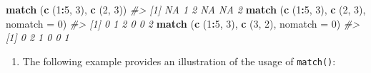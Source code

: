 \documentclass[
]{book}
\newenvironment{Shaded}{\begin{snugshade}}{\end{snugshade}}
\newcommand{\AttributeTok}[1]{\textcolor[rgb]{0.13,0.29,0.53}{#1}}
\newcommand{\CommentTok}[1]{\textcolor[rgb]{0.56,0.35,0.01}{\textit{#1}}}
\newcommand{\DecValTok}[1]{\textcolor[rgb]{0.00,0.00,0.81}{#1}}
\newcommand{\FunctionTok}[1]{\textcolor[rgb]{0.13,0.29,0.53}{\textbf{#1}}}
\newcommand{\NormalTok}[1]{#1}
\newcommand{\SpecialCharTok}[1]{\textcolor[rgb]{0.81,0.36,0.00}{\textbf{#1}}}
\providecommand{\tightlist}{%
  \setlength{\itemsep}{0pt}\setlength{\parskip}{0pt}}
\begin{document}
\begin{Shaded}
\begin{Highlighting}[]
\FunctionTok{match}\NormalTok{ (}\FunctionTok{c}\NormalTok{ (}\DecValTok{1}\SpecialCharTok{:}\DecValTok{5}\NormalTok{, }\DecValTok{3}\NormalTok{), }\FunctionTok{c}\NormalTok{ (}\DecValTok{2}\NormalTok{, }\DecValTok{3}\NormalTok{))}
\CommentTok{\#\textgreater{} [1] NA  1  2 NA NA  2}
\FunctionTok{match}\NormalTok{ (}\FunctionTok{c}\NormalTok{ (}\DecValTok{1}\SpecialCharTok{:}\DecValTok{5}\NormalTok{, }\DecValTok{3}\NormalTok{), }\FunctionTok{c}\NormalTok{ (}\DecValTok{2}\NormalTok{, }\DecValTok{3}\NormalTok{), }\AttributeTok{nomatch =} \DecValTok{0}\NormalTok{)}
\CommentTok{\#\textgreater{} [1] 0 1 2 0 0 2}
\FunctionTok{match}\NormalTok{ (}\FunctionTok{c}\NormalTok{ (}\DecValTok{1}\SpecialCharTok{:}\DecValTok{5}\NormalTok{, }\DecValTok{3}\NormalTok{), }\FunctionTok{c}\NormalTok{ (}\DecValTok{3}\NormalTok{, }\DecValTok{2}\NormalTok{), }\AttributeTok{nomatch =} \DecValTok{0}\NormalTok{)}
\CommentTok{\#\textgreater{} [1] 0 2 1 0 0 1}
\end{Highlighting}
\end{Shaded}

\begin{enumerate}
\def\labelenumi{(\alph{enumi})}
\setcounter{enumi}{5}
\tightlist
\item
  The following example provides an illustration of the usage of \texttt{match()}:
\end{enumerate}
\end{document}
